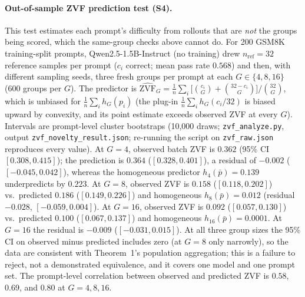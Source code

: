 \paragraph{Out-of-sample ZVF prediction test (S4).}
This test estimates each prompt's difficulty from rollouts that are
\emph{not} the groups being scored, which the same-group checks above cannot do.
For 200 GSM8K training-split prompts, Qwen2.5-1.5B-Instruct (no training) drew
$n_{\mathrm{ref}}=32$ reference samples per prompt ($c_i$ correct; mean pass
rate $0.568$) and then, with different sampling seeds, three fresh groups per
prompt at each $G\in\{4,8,16\}$ (600 groups per $G$). The predictor is
$\widehat{\mathrm{ZVF}}_G=\tfrac1n\sum_i\bigl[\binom{c_i}{G}+\binom{32-c_i}{G}\bigr]/\binom{32}{G}$,
which is unbiased for $\tfrac1n\sum_i h_G(p_i)$ (the plug-in
$\tfrac1n\sum_i h_G(c_i/32)$ is biased upward by convexity, and its point
estimate exceeds observed ZVF at every $G$). Intervals are prompt-level cluster bootstraps (10{,}000 draws;
\texttt{zvf\_analyze.py}, output \texttt{zvf\_novelty\_result.json}; re-running
the script on \texttt{zvf\_raw.json} reproduces every value).
At $G{=}4$, observed batch ZVF is $0.362$ (95\% CI $[0.308, 0.415]$); the
prediction is $0.364$ ($[0.328, 0.401]$), a residual of $-0.002$
($[-0.045, 0.042]$), whereas the homogeneous predictor $h_4(\bar p)=0.139$
underpredicts by $0.223$.
At $G{=}8$, observed ZVF is $0.158$ ($[0.118, 0.202]$) vs.\ predicted $0.186$ ($[0.149, 0.226]$) and homogeneous $h_8(\bar p)=0.012$ (residual $-0.028$, $[-0.059, 0.004]$).
At $G{=}16$, observed ZVF is $0.092$ ($[0.057, 0.130]$) vs.\ predicted $0.100$ ($[0.067, 0.137]$) and homogeneous $h_{16}(\bar p)=0.0001$.
At $G{=}16$ the residual is $-0.009$ ($[-0.031, 0.015]$). At all three group
sizes the 95\% CI on observed minus predicted includes zero (at $G{=}8$ only
narrowly), so the data are consistent with Theorem~1's population aggregation;
this is a failure to reject, not a demonstrated equivalence, and it covers one
model and one prompt set. The prompt-level correlation between observed and
predicted ZVF is $0.58$, $0.69$, and $0.80$ at $G=4,8,16$.


